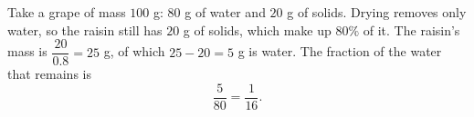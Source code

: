 Take a grape of mass $100$ g: $80$ g of water and $20$ g of solids. Drying removes only water, so the raisin still has $20$ g of solids, which make up $80\%$ of it. The raisin's mass is $\dfrac{20}{0.8}=25$ g, of which $25-20=5$ g is water. The fraction of the water that remains is
\[
\dfrac{5}{80}=\boxed{\dfrac{1}{16}}.
\]
